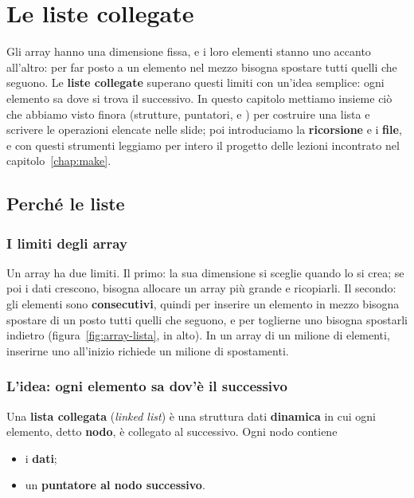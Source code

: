 \chapter{Le liste collegate}
\label{chap:liste}

Gli array hanno una dimensione fissa, e i loro elementi stanno uno accanto
all'altro: per far posto a un elemento nel mezzo bisogna spostare tutti
quelli che seguono. Le \textbf{liste collegate} superano questi limiti con
un'idea semplice: ogni elemento sa dove si trova il successivo. In questo
capitolo mettiamo insieme ciò che abbiamo visto finora (strutture, puntatori,
 e ) per costruire una lista e scrivere le operazioni
elencate nelle slide; poi introduciamo la \textbf{ricorsione} e i
\textbf{file}, e con questi strumenti leggiamo per intero il progetto delle
lezioni incontrato nel capitolo~\ref{chap:make}.

\section{Perché le liste}

\subsection{I limiti degli array}

Un array ha due limiti. Il primo: la sua dimensione si sceglie quando lo si
crea; se poi i dati crescono, bisogna allocare un array più grande e
ricopiarli. Il secondo: gli elementi sono \textbf{consecutivi}, quindi per
inserire un elemento in mezzo bisogna spostare di un posto tutti quelli che
seguono, e per toglierne uno bisogna spostarli indietro
(figura~\ref{fig:array-lista}, in alto). In un array di un milione di
elementi, inserirne uno all'inizio richiede un milione di spostamenti.

\subsection{L'idea: ogni elemento sa dov'è il successivo}

Una \textbf{lista collegata} (\textit{linked list}) è una struttura dati
\textbf{dinamica} in cui ogni elemento, detto \textbf{nodo}, è collegato al
successivo. Ogni nodo contiene

\begin{itemize}
  \item i \textbf{dati};
  \item un \textbf{puntatore al nodo successivo}.
\end{itemize}

